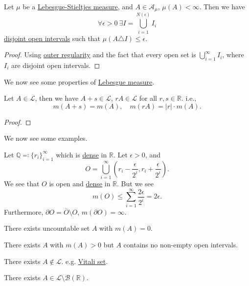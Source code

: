 \begin{proposition}
	Let \(\mu \) be a \hyperref[def:Lebesgue-Stieltjes-measure]{Lebesgue-Stieltjes measure}, and \(A\in \mathcal{A} _\mu \), \(\mu (A)<\infty \). Then we have
	\[
		\forall \epsilon >0\ \exists I = \bigcup_{i=1}^{N(\epsilon )} I_{i}
	\]
	\underline{disjoint open intervals} such that \(\mu (A\triangle  I)\leq \epsilon \).
\end{proposition}
\begin{proof}
	Using \hyperref[thm:outer-regularity]{outer regularity} and the fact that every open set is \(\bigcup_{i=1}^{\infty} I_{i}\), where \(I_{i}\) are disjoint open intervals.
\end{proof}

We now see some properties of \hyperref[def:Lebesgue-measure]{Lebesgue measure}.

\begin{theorem}
	Let \(A\in \mathcal{L}\), then we have \(A + s\in \mathcal{L}\), \(rA\in\mathcal{L}  \) for all \(r, s\in\mathbb{R} \). i.e.,
	\[
		m(A+s) = m(A),\quad m(rA) = \left\vert r \right\vert \cdot m(A).
	\]
\end{theorem}
\begin{proof}
\end{proof}

We now see some examples.

\begin{eg}
	Let \(\mathbb{Q}\eqqcolon\{r_{i}\}_{i=1}^{\infty}\) which is \href{https://en.wikipedia.org/wiki/Dense_set}{dense} in \(\mathbb{R} \). Let \(\epsilon >0\), and
	\[
		O = \bigcup_{i=1}^{\infty} \left(r_{i} - \frac{\epsilon}{2^i}, r_{i} + \frac{\epsilon}{2^i}\right).
	\]
	We see that \(O\) is open and \href{https://en.wikipedia.org/wiki/Dense_set}{dense} in \(\mathbb{R} \). But we see
	\[
		m(O) \leq \sum_{i=1}^{\infty} \frac{2\epsilon }{2^i} = 2\epsilon.
	\]
	Furthermore, \(\partial O = \overline{O} \setminus O\), \(m(\partial O) = \infty \).
\end{eg}

\begin{eg}
	There exists uncountable set \(A\) with \(m(A)=0\).
\end{eg}

\begin{eg}
	There exists \(A\) with \(m(A)>0\) but \(A\) contains no non-empty open intervals.
\end{eg}

\begin{eg}
	There exists \(A\notin \mathcal{L} \). e.g. \href{https://en.wikipedia.org/wiki/Vitali_set}{Vitali set}.
\end{eg}

\begin{eg}
	There exists \(A\in\mathcal{L} \setminus \mathcal{B} (\mathbb{R} )\).
\end{eg}